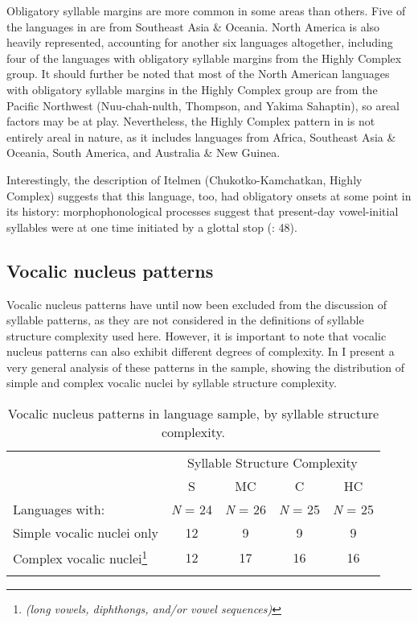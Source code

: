   Obligatory syllable margins are more common in some areas than others. Five of the languages in  are from Southeast Asia \& Oceania. North America is also heavily represented, accounting for another six languages altogether, including four of the languages with obligatory syllable margins from the Highly Complex group. It should further be noted that most of the North American languages with obligatory syllable margins in the Highly Complex group are from the Pacific Northwest (Nuu-chah-nulth, Thompson, and Yakima Sahaptin), so areal factors may be at play. Nevertheless, the Highly Complex pattern in  is not entirely areal in nature, as it includes languages from Africa, Southeast Asia \& Oceania, South America, and Australia \& New Guinea. 

  Interestingly, the description of Itelmen (Chukotko-Kamchatkan, Highly Complex) suggests that this language, too, had obligatory onsets at some point in its history: morphophonological processes suggest that present-day vowel-initial syllables were at one time initiated by a glottal stop (\citealt{GeorgVolodin1999}: 48).

\subsection{Vocalic nucleus patterns}\label{sec:3.3.4}

  Vocalic nucleus patterns have until now been excluded from the discussion of syllable patterns, as they are not considered in the definitions of syllable structure complexity used here. However, it is important to note that vocalic nucleus patterns can also exhibit different degrees of complexity. In  I present a very general analysis of these patterns in the sample, showing the distribution of simple and complex vocalic nuclei by syllable structure complexity.

\begin{table}
\begin{tabular}{lcccc}
\lsptoprule
 & \multicolumn{4}{c}{Syllable Structure Complexity}\\\cmidrule(lr){2-5}
  & S & MC & C & HC\\
  Languages with:     & \textit{N} = 24 & \textit{N} = 26 & \textit{N} = 25 & \textit{N} = 25\\\midrule
 Simple vocalic nuclei only & 12 & \phantom{1}9 & \phantom{1}9 & \phantom{1}9\\
 Complex vocalic nuclei\footnote{\textit{(long vowels, diphthongs, and\slash or vowel sequences)}} & 12 & 17 & 16 & 16\\
\lspbottomrule
\end{tabular}
\caption{\label{tab:3.5}Vocalic nucleus patterns in language sample, by syllable structure complexity.}
\end{table}


